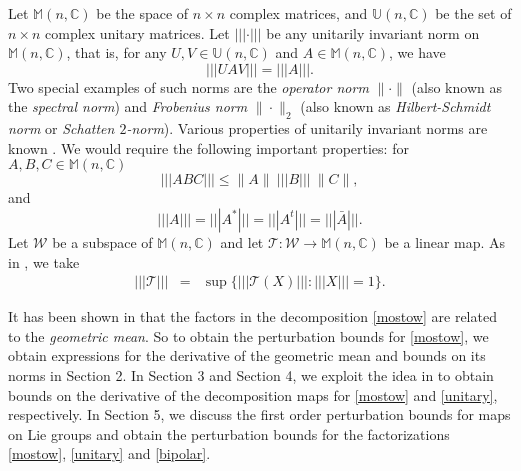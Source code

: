 \documentclass[12pt,epsfig,reqno]{amsart}
\newcommand{\C}{\mathbb{C}}
\theoremstyle{remark}
\begin{document}
Let $\mathbb M(n, \C)$ be the space of $n\times n$ complex matrices,
and $\mathbb U(n, \C)$ be the set of $n\times n$ complex unitary matrices.
Let $|||\cdot|||$ be any unitarily invariant norm on $\mathbb M(n,\C)$, that is, for any $U,V\in \mathbb U(n,\C)$ and $A\in \mathbb M(n,\C)$, we have
$$|||UAV|||=|||A|||.$$ Two special examples of such norms are the \emph{operator norm} $\|\cdot\|$ (also known as the \emph{spectral norm}) and \emph{Frobenius norm} $\|\cdot\|_2$ (also known as \emph{Hilbert-Schmidt norm} or \emph{Schatten $2$-norm}).
Various properties of unitarily invariant norms are known \cite[Chapter IV]{bhatia_matrix_analysis}. We would require the following important properties:
for $A,B,C\in \mathbb M(n,\C)$
\begin{equation}
|||ABC|||\leq \|A\|\ |||B|||\ \|C\|,\label{tineq}
\end{equation}
and
\begin{equation}
|||A|||=|||A^*|||=|||A^t|||=|||\bar A|||.
\end{equation}
Let $\mathscr W$ be a subspace of $\mathbb M(n,\C)$ and let $\mathcal T:\mathscr W\rightarrow \mathbb M(n,\C)$ be a linear map. As in \cite{bhatia_Matrix_factorizations}, we take
\begin{eqnarray}
|||\mathcal T|||&=&\sup\{|||\mathcal T(X)|||: |||X|||=1 \}.\label{opnorm}
\end{eqnarray}

 It has been shown in \cite{barbaresco, bhatia_bipolar} that the factors in the decomposition \eqref{mostow} are related to the \emph{geometric mean}. So to obtain the perturbation bounds for \eqref{mostow},  we obtain expressions for the derivative of the geometric mean and bounds on its norms in Section 2. In Section 3 and Section 4, we exploit the idea in \cite{bhatia_Matrix_factorizations} to obtain bounds on the derivative of the decomposition maps for \eqref{mostow} and \eqref{unitary}, respectively. In Section 5, we discuss  the first order perturbation bounds for maps on Lie groups and obtain the perturbation bounds for the factorizations \eqref{mostow}, \eqref{unitary} and \eqref{bipolar}.
\end{document}
